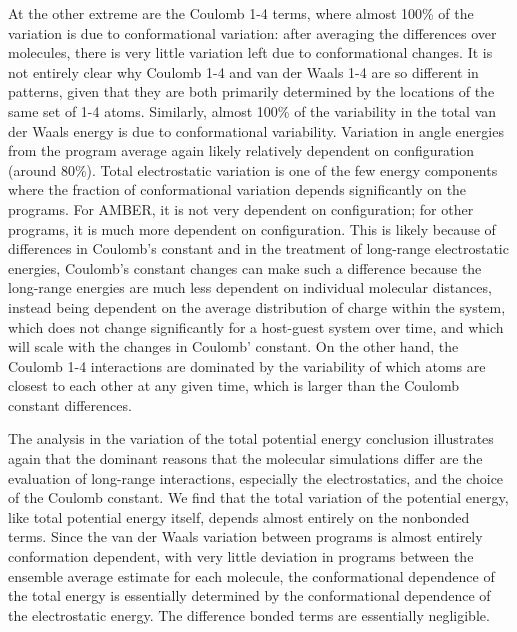 At the other extreme are the Coulomb 1-4 terms, where almost 100\% of
the variation is due to conformational variation: after averaging the
differences over molecules, there is very little variation left due to
conformational changes. It is not entirely clear why Coulomb 1-4 and
van der Waals 1-4 are so different in patterns, given that they are
both primarily determined by the locations of the same set of 1-4 atoms.
Similarly, almost 100\% of the variability in the total van der Waals
energy is due to conformational variability.  Variation in angle
energies from the program average again likely relatively dependent on
configuration (around 80\%). 
Total electrostatic variation is one of the few energy components
where the fraction of conformational variation depends significantly
on the programs.  For AMBER, it is not very dependent on
configuration; for other programs, it is much more dependent on
configuration. This is likely because of differences in Coulomb's
constant and in the treatment of long-range electrostatic energies,
Coulomb's constant changes can make such a difference because the
long-range energies are much less dependent on individual molecular
distances, instead being dependent on the average distribution of
charge within the system, which does not change significantly for a
host-guest system over time, and which will scale with the changes in
Coulomb' constant.  On the other hand, the Coulomb 1-4 interactions
are dominated by the variability of which atoms are closest to each
other at any given time, which is larger than the Coulomb constant
differences.

The analysis in the variation of the total potential energy conclusion
illustrates again that the dominant reasons that the molecular
simulations differ are the evaluation of long-range interactions,
especially the electrostatics, and the choice of the Coulomb
constant. We find that the total variation of the potential energy,
like total potential energy itself, depends almost entirely on the
nonbonded terms.  Since the van der Waals variation between programs
is almost entirely conformation dependent, with very little deviation
in programs between the ensemble average estimate for each molecule,
the conformational dependence of the total energy is essentially
determined by the conformational dependence of the electrostatic
energy. The difference bonded terms are essentially negligible. 


